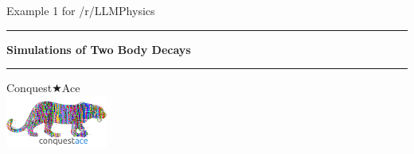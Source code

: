 \begin{titlepage}
    \begin{center}
        \vspace*{2cm}
        
        {\Large Example 1 for /r/LLMPhysics} \\[1.5cm]
        
        \hrule
        \vspace{1cm}
        
        {\Huge \textbf{Simulations of Two Body Decays}} \\[1cm]
        
        \hrule
        \vspace{1.5cm}
         \Large {Conquest{\(\bigstar\)}Ace}\\ [1 cm]

 

         {\includegraphics[width=0.25\textwidth]{logo.png} \\[1cm]}



        \vfill
    \end{center}
\end{titlepage}
